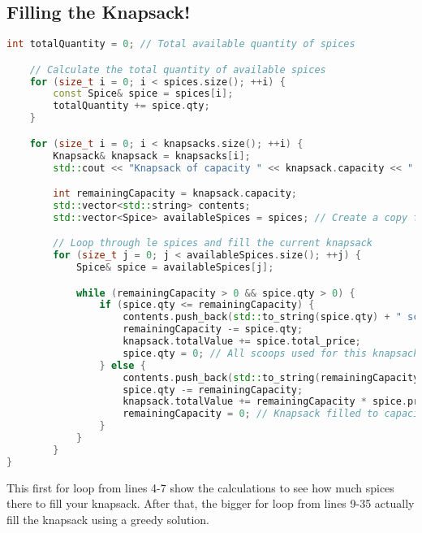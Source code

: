 \documentclass[letterpaper, 10pt,DIV=13]{scrartcl}
\numberwithin{equation}{section} %
\numberwithin{figure}{section} %
\numberwithin{table}{section} %
\begin{document}
\subsection{Filling the Knapsack!}
\begin{lstlisting}[language=c++, caption= Code to fill the knapsack with spices]
int totalQuantity = 0; // Total available quantity of spices

    // Calculate the total quantity of available spices
    for (size_t i = 0; i < spices.size(); ++i) {
        const Spice& spice = spices[i];
        totalQuantity += spice.qty;
    }

    for (size_t i = 0; i < knapsacks.size(); ++i) {
        Knapsack& knapsack = knapsacks[i];
        std::cout << "Knapsack of capacity " << knapsack.capacity << " is worth ";

        int remainingCapacity = knapsack.capacity;
        std::vector<std::string> contents;
        std::vector<Spice> availableSpices = spices; // Create a copy for this knapsack

        // Loop through le spices and fill the current knapsack
        for (size_t j = 0; j < availableSpices.size(); ++j) {
            Spice& spice = availableSpices[j];

            while (remainingCapacity > 0 && spice.qty > 0) {
                if (spice.qty <= remainingCapacity) {
                    contents.push_back(std::to_string(spice.qty) + " scoops of " + spice.name);
                    remainingCapacity -= spice.qty;
                    knapsack.totalValue += spice.total_price;
                    spice.qty = 0; // All scoops used for this knapsack
                } else {
                    contents.push_back(std::to_string(remainingCapacity) + " scoops of " + spice.name);
                    spice.qty -= remainingCapacity;
                    knapsack.totalValue += remainingCapacity * spice.price_per_unit;
                    remainingCapacity = 0; // Knapsack filled to capacity for this knapsack
                }
            }
        }
}
\end{lstlisting}
This first for loop from lines 4-7 show the calculations to see how much spices there to fill your knapsack. After that, the bigger for loop from lines 9-35 actually fill the knapsack using a greedy solution. 
\end{document}
